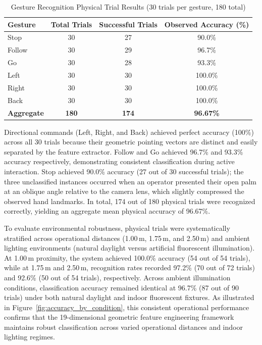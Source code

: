 \begin{table}[H]
\centering
\caption{Gesture Recognition Physical Trial Results (30 trials per gesture, 180 total)}
\label{tab:gesture_results}
\begin{tabular}{|l|c|c|c|}
\hline
\textbf{Gesture} & \textbf{Total Trials} & \textbf{Successful Trials} & \textbf{Observed Accuracy (\%)} \\
\hline
Stop & 30 & 27 & 90.0\% \\
\hline
Follow & 30 & 29 & 96.7\% \\
\hline
Go & 30 & 28 & 93.3\% \\
\hline
Left & 30 & 30 & 100.0\% \\
\hline
Right & 30 & 30 & 100.0\% \\
\hline
Back & 30 & 30 & 100.0\% \\
\hline
\textbf{Aggregate} & \textbf{180} & \textbf{174} & \textbf{96.67\%} \\
\hline
\end{tabular}
\end{table}

Directional commands (Left, Right, and Back) achieved perfect accuracy (100\%) across all 30 trials because their geometric pointing vectors are distinct and easily separated by the feature extractor. Follow and Go achieved 96.7\% and 93.3\% accuracy respectively, demonstrating consistent classification during active interaction. Stop achieved 90.0\% accuracy (27 out of 30 successful trials); the three unclassified instances occurred when an operator presented their open palm at an oblique angle relative to the camera lens, which slightly compressed the observed hand landmarks. In total, 174 out of 180 physical trials were recognized correctly, yielding an aggregate mean physical accuracy of 96.67\%.

To evaluate environmental robustness, physical trials were systematically stratified across operational distances (1.00\,m, 1.75\,m, and 2.50\,m) and ambient lighting environments (natural daylight versus artificial fluorescent illumination). At 1.00\,m proximity, the system achieved 100.0\% accuracy (54 out of 54 trials), while at 1.75\,m and 2.50\,m, recognition rates recorded 97.2\% (70 out of 72 trials) and 92.6\% (50 out of 54 trials), respectively. Across ambient illumination conditions, classification accuracy remained identical at 96.7\% (87 out of 90 trials) under both natural daylight and indoor fluorescent fixtures. As illustrated in Figure~\ref{fig:accuracy_by_condition}, this consistent operational performance confirms that the 19-dimensional geometric feature engineering framework maintains robust classification across varied operational distances and indoor lighting regimes.

